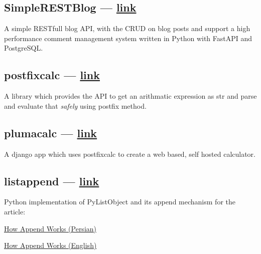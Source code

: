 \begin{multicols}{2}
\subsection{{SimpleRESTBlog --- \href{https://github.com/mahdihaghverdi/simplerestblog/}{link}}}
\begin{zitemize}
\item A simple RESTfull blog API, with the CRUD on blog posts and support a high performance comment management system written in Python with FastAPI and PostgreSQL.
\end{zitemize}

\subsection{{postfixcalc --- \href{https://github.com/mahdihaghverdi/postfixcalc}{link}}}
\begin{zitemize}
\item A library which provides the API to get an arithmatic expression as {\ttfamily str} and parse and evaluate that \textit{safely} using postfix method.
\end{zitemize}

\subsection{{plumacalc --- \href{https://github.com/mahdihaghverdi/plumacalc}{link}}}
\begin{zitemize}
\item A django app which uses postfixcalc to create a web based, self hosted calculator.
\end{zitemize}

\subsection{{listappend --- \href{https://github.com/mahdihaghverdi/listappend}{link}}}
\begin{zitemize}
\item Python implementation of {\ttfamily PyListObject} and its {\ttfamily append}  mechanism for the article:
\begin{zitemize}
\item
\href {https://virgool.io/@liewpl/how-append-works-gp4apwtpr0bt}{How Append Works (Persian)}
\item \href{https://medium.com/@mahdihaghverdi/how-list-append-is-implemented-in-c-layer-of-cpython-interpreter-bf88632819c0}{How Append Works (English)}
\end{zitemize}
\end{zitemize}


\end{multicols}
